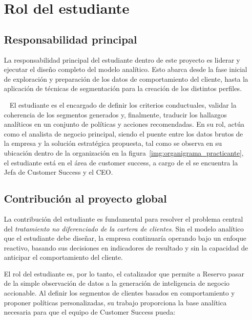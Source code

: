 \newpage

\section{Rol del estudiante}
\subsection{Responsabilidad principal}

La responsabilidad principal del estudiante dentro de este proyecto es liderar y ejecutar el diseño completo del modelo analítico. Esto abarca desde la fase inicial de exploración y preparación de los datos de comportamiento del cliente, hasta la aplicación de técnicas de segmentación para la creación de los distintos perfiles. \\


	~ El estudiante es el encargado de definir los criterios conductuales, validar la coherencia de los segmentos generados y, finalmente, traducir los hallazgos analíticos en un conjunto de políticas y acciones recomendadas. En su rol, actúa como el analista de negocio principal, siendo el puente entre los datos brutos de la empresa y la solución estratégica propuesta, tal como se observa en su ubicación dentro de la organización en la figura~\ref{img:organigrama_practicante}, el estudiante está en el área de customer success, a cargo de el se encuentra la Jefa de Customer Success y el CEO.\\

\subsection{Contribución al proyecto global}

La contribución del estudiante es fundamental para resolver el problema central del \textit{tratamiento no diferenciado de la cartera de clientes}. Sin el modelo analítico que el estudiante debe diseñar, la empresa continuaría operando bajo un enfoque reactivo, basando sus decisiones en indicadores de resultado y sin la capacidad de anticipar el comportamiento del cliente.

El rol del estudiante es, por lo tanto, el catalizador que permite a Reservo pasar de la simple observación de datos a la generación de inteligencia de negocio accionable. Al definir los segmentos de clientes basados en comportamiento y proponer políticas personalizadas, su trabajo proporciona la base analítica necesaria para que el equipo de Customer Success pueda:

